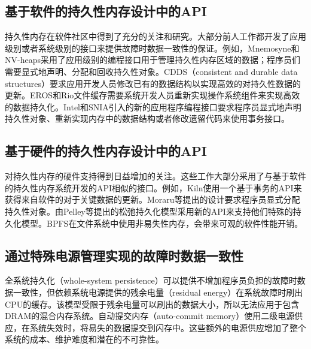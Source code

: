 \subsection{基于软件的持久性内存设计中的API}
持久性内存在软件社区中得到了充分的关注和研究\cite{Volos:2011:MLP:1950365.1950379,
Coburn:2011:NMP:1950365.1950380,
Venkataraman:2011:CDD:1960475.1960480, Intel:PMEM, SNIA:2013:NPM,
Shapiro:1999:EFC:319151.319163, Chen:1996:RFC:237090.237154}。大部分前人工作都开发了应用级别或者系统级别的接口来提供故障时数据一致性的保证。例如，Mnemosyne\cite{Volos:2011:MLP:1950365.1950379}和NV-heaps\cite{Coburn:2011:NMP:1950365.1950380}采用了应用级别的编程接口用于管理持久性内存区域的数据；程序员们需要显式地声明、分配和回收持久性对象。CDDS（consistent and durable data structures）\cite{Venkataraman:2011:CDD:1960475.1960480}要求应用开发人员修改已有的数据结构以实现高效的对持久性数据的更新。EROS\cite{Shapiro:1999:EFC:319151.319163}和Rio文件缓存\cite{Chen:1996:RFC:237090.237154}需要系统开发人员重新实现操作系统组件来实现高效的数据持久化。Intel\cite{Intel:PMEM}和SNIA\cite{SNIA:2013:NPM}引入的新的应用程序编程接口要求程序员显式地声明持久性对象\cite{Volos:2011:MLP:1950365.1950379,
Coburn:2011:NMP:1950365.1950380}、重新实现内存中的数据结构\cite{Venkataraman:2011:CDD:1960475.1960480}或者修改遗留代码来使用事务接口\cite{Volos:2011:MLP:1950365.1950379,Coburn:2011:NMP:1950365.1950380}。

\subsection{基于硬件的持久性内存设计中的API}
对持久性内存的硬件支持得到日益增加的关注\cite{meza2013case, Condit:2009:BIT:1629575.1629589,
Zhao:2013:KCP:2540708.2540744, Moraru:2013:CDS, Pelley:2013:SMN,
Kannan:2014:RCP, Liu:2014:NDU:2541940.2541957, Pelley:2014:MP,
6378661, 6974684, Zhao:2014:FFH, justin-taco14}。这些工作大部分采用了与基于软件的持久性内存系统开发的API相似的接口。例如，Kiln\cite{Zhao:2013:KCP:2540708.2540744}使用一个基于事务的API来获得来自软件的对于关键数据的更新。Moraru等\cite{Moraru:2013:CDS}提出的设计要求程序员显式分配持久性对象。由Pelley等\cite{Pelley:2014:MP}提出的松弛持久化模型采用新的API来支持他们特殊的持久化模型。BPFS\cite{Condit:2009:BIT:1629575.1629589}在文件系统中使用非易失性内存，会带来可观的软件性能开销。

\subsection{通过特殊电源管理实现的故障时数据一致性}
全系统持久化（whole-system persistence）\cite{Narayanan:2012:WP:2150976.2151018}可以提供不增加程序员负担的故障时数据一致性，但依赖系统电源提供的残余电量（residual energy）在系统故障时刷出CPU的缓存。该模型受限于残余电量可以刷出的数据大小，所以无法应用于包含DRAM的混合内存系统。自动提交内存（auto-commit memory）\cite{flynn2012apparatus}使用二级电源供应，在系统失效时，将易失的数据提交到闪存中。这些额外的电源供应增加了整个系统的成本、维护难度和潜在的不可靠性。


